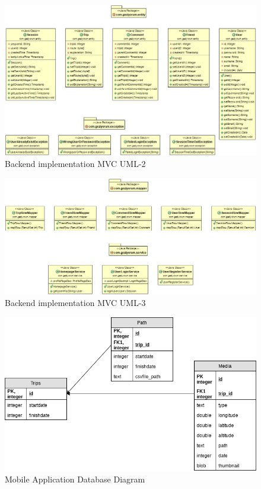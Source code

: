 \begin{figure}[!htbp]
\centering
\includegraphics[width=\textwidth]{projectChapters/images/backend2.png}
\caption{Backend implementation MVC UML-2}
\end{figure}


\begin{figure}[!htbp]
\centering
\includegraphics[width=\textwidth]{projectChapters/images/backend3.png}
\caption{Backend implementation MVC UML-3}
\end{figure} 

\begin{figure}[!htbp]
\centering
\includegraphics[width=\textwidth]{projectChapters/images/android_database.png}
\caption{Mobile Application Database Diagram}
\end{figure} 